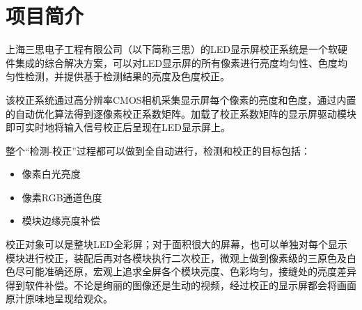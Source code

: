 \section{项目简介}

上海三思电子工程有限公司（以下简称三思）的LED显示屏校正系统是一个软硬件集成的综合解决方案，可以对LED显示屏的所有像素进行亮度均匀性、色度均匀性检测，并提供基于检测结果的亮度及色度校正。

该校正系统通过高分辨率CMOS相机采集显示屏每个像素的亮度和色度，通过内置的自动优化算法得到逐像素校正系数矩阵。加载了校正系数矩阵的显示屏驱动模块即可实时地将输入信号校正后呈现在LED显示屏上。

整个“检测-校正”过程都可以做到全自动进行，检测和校正的目标包括：

\begin{itemize}
    \item 像素白光亮度
    \item 像素RGB通道色度
    \item 模块边缘亮度补偿
\end{itemize}

校正对象可以是整块LED全彩屏；对于面积很大的屏幕，也可以单独对每个显示模块进行校正，装配后再对各模块执行二次校正，微观上做到像素级的三原色及白色尽可能准确还原，宏观上追求全屏各个模块亮度、色彩均匀，接缝处的亮度差异得到软件补偿。不论是绚丽的图像还是生动的视频，经过校正的显示屏都会将画面原汁原味地呈现给观众。

\clearpage
